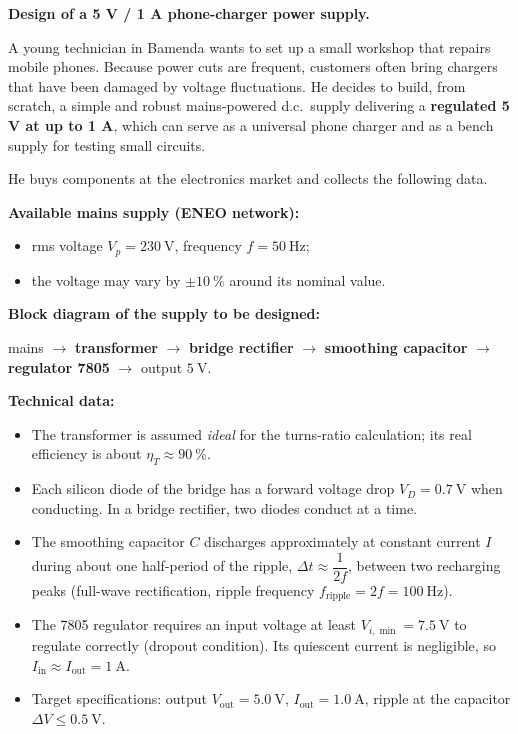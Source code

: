 \documentclass[11pt]{article}
\newcounter{popsec}
\newcounter{popsub}
\newcommand{\courssub}[1]{%
  \stepcounter{popsub}%
  \par\vspace{9pt}\noindent{\popxbold\fontsize{11.5}{13}\selectfont\color{popink}{\color{poporange}\thepopsec.\thepopsub}\hspace{6pt}#1}\par\nopagebreak\vspace{4pt}
}
\begin{document}
\courssub{Situation}

\textbf{Design of a 5 V / 1 A phone-charger power supply.}\par

A young technician in Bamenda wants to set up a small workshop that repairs mobile phones. Because power cuts are frequent, customers often bring chargers that have been damaged by voltage fluctuations. He decides to build, from scratch, a simple and robust mains-powered d.c.\ supply delivering a \textbf{regulated 5 V at up to 1 A}, which can serve as a universal phone charger and as a bench supply for testing small circuits.

He buys components at the electronics market and collects the following data.

\textbf{Available mains supply (ENEO network):}
\begin{itemize}
\item rms voltage $V_p = 230\ \mathrm{V}$, frequency $f = 50\ \mathrm{Hz}$;
\item the voltage may vary by $\pm 10\ \%$ around its nominal value.
\end{itemize}

\textbf{Block diagram of the supply to be designed:}
\begin{center}
mains $\rightarrow$ \textbf{transformer} $\rightarrow$ \textbf{bridge rectifier} $\rightarrow$ \textbf{smoothing capacitor} $\rightarrow$ \textbf{regulator 7805} $\rightarrow$ output $5\ \mathrm{V}$.
\end{center}

\textbf{Technical data:}
\begin{itemize}
\item The transformer is assumed \emph{ideal} for the turns-ratio calculation; its real efficiency is about $\eta_T \approx 90\ \%$.
\item Each silicon diode of the bridge has a forward voltage drop $V_D = 0.7\ \mathrm{V}$ when conducting. In a bridge rectifier, two diodes conduct at a time.
\item The smoothing capacitor $C$ discharges approximately at constant current $I$ during about one half-period of the ripple, $\Delta t \approx \dfrac{1}{2f}$, between two recharging peaks (full-wave rectification, ripple frequency $f_{\text{ripple}} = 2f = 100\ \mathrm{Hz}$).
\item The 7805 regulator requires an input voltage at least $V_{i,\min} = 7.5\ \mathrm{V}$ to regulate correctly (dropout condition). Its quiescent current is negligible, so $I_{\text{in}} \approx I_{\text{out}} = 1\ \mathrm{A}$.
\item Target specifications: output $V_{\text{out}} = 5.0\ \mathrm{V}$, $I_{\text{out}} = 1.0\ \mathrm{A}$, ripple at the capacitor $\Delta V \leq 0.5\ \mathrm{V}$.
\end{itemize}
\end{document}
